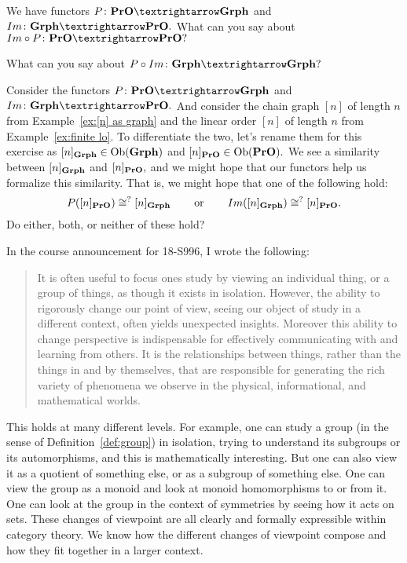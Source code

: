 \documentclass[../main/CT4S-EN-RU]{subfiles}
\begin{document}
\begin{exerciseRUS}
\end{exerciseRUS}

\begin{exerciseENG}
We have functors $P\colon\PrO{→}\Grph$ and $Im\colon\Grph{→}\PrO.$
\sexc What can you say about $Im\circ P\colon\PrO{→}\PrO?$
\item What can you say about $P\circ Im\colon\Grph{→}\Grph?$
\endsexc
\end{exerciseENG}

\begin{exerciseRUS}
\end{exerciseRUS}

\begin{exerciseENG}
Consider the functors $P\colon\PrO{→}\Grph$ and $Im\colon\Grph{→}\PrO.$ And consider the chain graph $[n]$ of length $n$ from Example~\ref{ex:[n] as graph} and the linear order $[n]$ of length $n$ from Example~\ref{ex:finite lo}. To differentiate the two, let's rename them for this exercise as $[n]_{{\mathbf{Grph}}}\in\operatorname{Ob}({\mathbf{Grph}})$ and $[n]_{{\mathbf{PrO}}}\in\operatorname{Ob}({\mathbf{PrO}}).$ We see a similarity between $[n]_{{\mathbf{Grph}}}$ and $[n]_{{\mathbf{PrO}}},$ and we might hope that our functors help us formalize this similarity. That is, we might hope that one of the following hold: 
$$P([n]_{{\mathbf{PrO}}})\cong^? [n]_{{\mathbf{Grph}}}\hspace{.3in}\textnormal{or}\hspace{.3in} Im([n]_{{\mathbf{Grph}}})\cong^? [n]_{{\mathbf{PrO}}}.$$ 
Do either, both, or neither of these hold?
\end{exerciseENG}

\begin{exerciseRUS}
\end{exerciseRUS}

\begin{remarkENG}
In the course announcement for 18-S996, I wrote the following:
\begin{quote}
It is often useful to focus ones study by viewing an individual thing, or a group of things, as though it exists in isolation. However, the ability to rigorously change our point of view, seeing our object of study in a different context, often yields unexpected insights. Moreover this ability to change perspective is indispensable for effectively communicating with and learning from others. It is the relationships between things, rather than the things in and by themselves, that are responsible for generating the rich variety of phenomena we observe in the physical, informational, and mathematical worlds.
\end{quote}
This holds at many different levels. For example, one can study a group (in the sense of Definition~\ref{def:group}) in isolation, trying to understand its subgroups or its automorphisms, and this is mathematically interesting. But one can also view it as a quotient of something else, or as a subgroup of something else. One can view the group as a monoid and look at monoid homomorphisms to or from it. One can look at the group in the context of symmetries by seeing how it acts on sets. These changes of viewpoint are all clearly and formally expressible within category theory. We know how the different changes of viewpoint compose and how they fit together in a larger context. 
\end{remarkENG}
\end{document}
